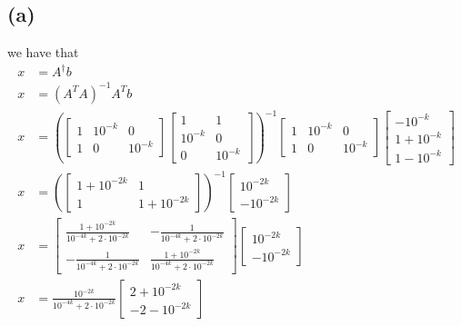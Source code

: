 \subsection*{(a)}
we have that 
\begin{align*}
    x&=A^{\dagger}b\\
    x&=(A^TA)^{-1}A^Tb\\
    x&=\left(\begin{bmatrix}
        1 & 10^{-k} & 0\\
        1 & 0 & 10^{-k}
    \end{bmatrix}
    \begin{bmatrix}
        1 & 1\\
        10^{-k} & 0\\
        0 & 10^{-k}
    \end{bmatrix}\right)^{-1}
    \begin{bmatrix}
        1 & 10^{-k} & 0\\
        1 & 0 & 10^{-k}
    \end{bmatrix}
    \begin{bmatrix}
        -10^{-k}\\
        1+10^{-k}\\
        1-10^{-k}
    \end{bmatrix}\\
    x&=\left(\begin{bmatrix}
        1+10^{-2k} & 1\\
        1 & 1+10^{-2k}
    \end{bmatrix}\right)^{-1}\begin{bmatrix}
        10^{-2k}\\
        -10^{-2k}
    \end{bmatrix}\\
    x&=\begin{bmatrix}\frac{1+10^{-2k}}{10^{-4k}+2\cdot10^{-2k}}&-\frac{1}{10^{-4k}+2\cdot10^{-2k}}\\ -\frac{1}{10^{-4k}+2\cdot10^{-2k}}&\frac{1+10^{-2k}}{10^{-4k}+2\cdot10^{-2k}}
    \end{bmatrix}\begin{bmatrix}
        10^{-2k}\\
        -10^{-2k}
    \end{bmatrix}\\
    x&=\frac{10^{-2k}}{10^{-4k}+2\cdot10^{-2k}}\begin{bmatrix}
        2+10^{-2k}\\
        -2-10^{-2k}
    \end{bmatrix}
\end{align*}
